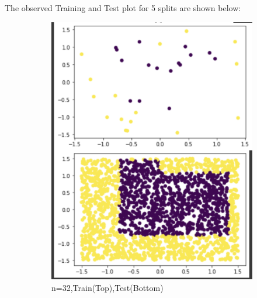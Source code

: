 \documentclass[a4paper]{article}
\theoremstyle{definition}
\newenvironment{soln}{
    \leavevmode\color{blue}\ignorespaces
}{}
\begin{document}
\begin{enumerate}
\begin{soln}
    The observed Training and Test plot for 5 splits are shown below:\\
    \begin{figure}[H]
        \begin{subfigure}{0.5\textwidth}
            \centering
            \includegraphics[scale=0.5]{32.png}
            \caption{n=32,Train(Top),Test(Bottom)}
            \label{fig:q2}
        \end{subfigure}
        \begin{subfigure}{0.5\textwidth}
            \centering

\end{subfigure}
\end{figure}
\end{soln}
\end{enumerate}
\end{document}
